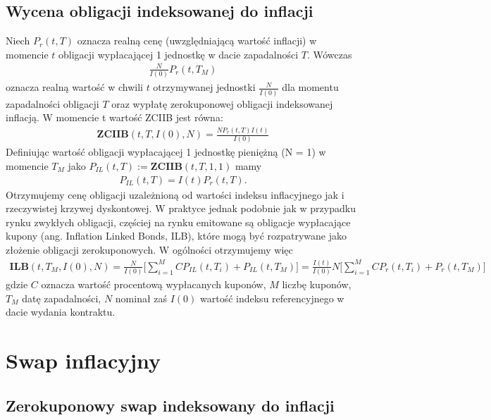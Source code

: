 \documentclass{mini}
\theoremstyle{mythstyle}
\begin{document}
	\subsection*{Wycena obligacji indeksowanej do inflacji}
	
	Niech $P_r(t,T)$ oznacza realną cenę (uwzględniającą wartość inflacji) w momencie $t$ obligacji wypłacającej 1 jednostkę w dacie zapadalności $T$. Wówczas
	\begin{eqnarray}
		\frac{N}{I(0)} P_r(t,T_M) 
	\end{eqnarray}
	oznacza realną wartość w chwili $t$ otrzymywanej jednostki $\frac{N}{I(0)}$ dla momentu zapadalności obligacji $T$ oraz wypłatę zerokuponowej obligacji indeksowanej inflacją. W momencie t wartość ZCIIB jest równa:
	\begin{eqnarray}
		 \mathbf{ZCIIB}(t,T,I(0),N) = \frac{N P_r(t,T) I(t)}{I(0)} 
	 \end{eqnarray}
	Definiując wartość obligacji wypłacającej 1 jednostkę pieniężną (N = 1) w momencie $T_M$ jako $P_{IL}(t,T) := \mathbf{ZCIIB}(t,T,1,1)$ mamy
	\begin{eqnarray}
		P_{IL}(t,T) = I(t) P_r(t,T).
	\end{eqnarray}
	Otrzymujemy cenę obligacji uzależnioną od wartości indeksu inflacyjnego jak i rzeczywistej krzywej dyskontowej. 
	W praktyce jednak podobnie jak w przypadku rynku zwykłych obligacji, częściej na rynku emitowane są obligacje wypłacające kupony (ang. Inflation Linked Bonds, ILB), które mogą być rozpatrywane jako złożenie obligacji zerokuponowych. W ogólności otrzymujemy więc
	\begin{eqnarray*}
		\mathbf{ILB}(t,T_M,I(0),N) = \frac{N}{I(0)} \bigg[ \sum_{i=1}^M C P_{IL}(t,T_i) + P_{IL}(t,T_M)\bigg]
									 = \frac{I(t)}{I(0)}N \bigg[ \sum_{i=1}^M C P_{r}(t,T_i) + P_{r}(t,T_M)\bigg]
	\end{eqnarray*}
	gdzie $C$ oznacza wartość procentową wypłacanych kuponów, $M$ liczbę kuponów, $T_M$ datę zapadalności, $N$ nominał zaś $I(0)$ wartość indeksu referencyjnego w dacie wydania kontraktu.
		
	\section{Swap inflacyjny}
		
	\subsection{Zerokuponowy swap indeksowany do inflacji}
		
\end{document}
